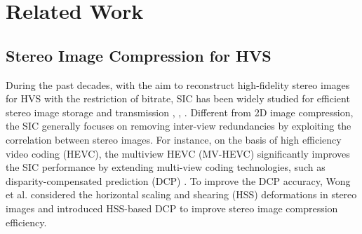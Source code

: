 \section{Related Work}
\label{section2}




\subsection{Stereo Image Compression for HVS} 

During the past decades, with the aim to reconstruct high-fidelity stereo images for HVS with the restriction of bitrate, \textcolor[rgb]{0,0,0}{SIC has been widely studied for efficient stereo image storage and transmission \cite{2002-TCSVT-SIC}, \cite{2009-TCSVT-SIC}, \cite{2012-TCSVT-SVC}.}
Different from 2D image compression, the SIC generally focuses on removing inter-view redundancies by exploiting the correlation between stereo images. For instance, on the basis of high efficiency video coding (HEVC), the multiview HEVC (MV-HEVC) \cite{2011-IEEE-MVC} significantly improves the SIC performance by extending multi-view coding technologies, such as disparity-compensated prediction (DCP) \cite{2024-TCSVT-Zhang}. To improve the DCP accuracy,  Wong et al.  \cite{2012-TCSVT-SVC} considered the horizontal scaling and shearing (HSS) deformations in stereo images and introduced HSS-based DCP to improve stereo image compression efficiency. 	

